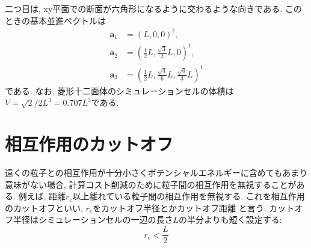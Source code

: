 二つ目は, xy平面での断面が六角形になるように交わるような向きである.
このときの基本並進ベクトルは
\begin{align}
  \bm{a}_{1} &= \left(           L,                    0,  0\right)^{\mathrm{t}}, \\
  \bm{a}_{2} &= \left(\frac{1}{2}L, \frac{\sqrt{3}}{2}L,   0\right)^{\mathrm{t}}, \\
  \bm{a}_{3} &= \left(\frac{1}{2}L, \frac{\sqrt{3}}{6}L,\frac{\sqrt{6}}{3}L \right)^\mathrm{t}
\end{align}
である.
なお, 菱形十二面体のシミュレーションセルの体積は$V = \sqrt{2}/2L^{3} = 0.707 L^{3}$である.

\section{相互作用のカットオフ}
遠くの粒子との相互作用が十分小さくポテンシャルエネルギーに含めてもあまり意味がない場合,
計算コスト削減のために粒子間の相互作用を無視することがある.
例えば, 距離$r_{\mathrm{c}}$以上離れている粒子間の相互作用を無視する.
これを相互作用のカットオフといい, $r_{\mathrm{c}}$をカットオフ半径とかカットオフ距離
と言う. カットオフ半径はシミュレーションセルの一辺の長さ$L$の半分よりも短く設定する:
\begin{equation}
 r_{c} < \frac{L}{2}
\end{equation}

